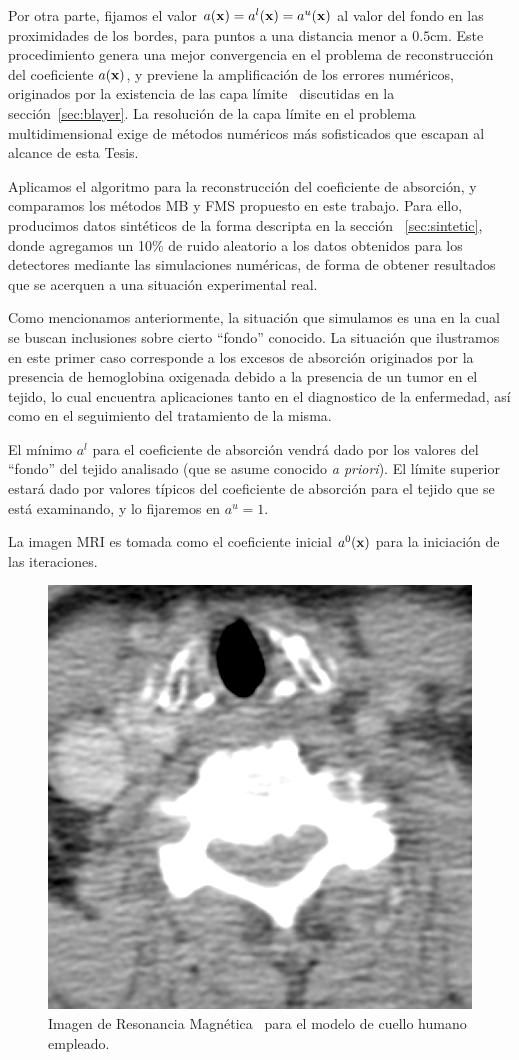 Por otra parte, fijamos el valor  $a(\mathbf{x})=a^l(\mathbf{x})=a^u(\mathbf{x})$ 
al valor del fondo en las proximidades de los bordes, para puntos 
a una distancia menor a $0.5$cm. Este procedimiento genera una mejor 
convergencia en el problema de reconstrucción del coeficiente $a(\mathbf{x})$, y previene 
la amplificación de los errores numéricos, originados por la existencia 
de las capa límite~\cite{Gaggioli2021} discutidas en la sección~\ref{sec:blayer}. 
La resolución de la capa límite en el problema multidimensional exige de métodos 
numéricos más sofisticados que escapan al alcance de esta Tesis. 

Aplicamos el algoritmo para la reconstrucción del coeficiente 
de absorción, y comparamos los métodos MB y FMS propuesto en este trabajo. 
Para ello, producimos datos sintéticos de la forma descripta en la sección~
\ref{sec:sintetic}, donde agregamos un 10\% de ruido aleatorio a los datos obtenidos 
para los detectores mediante las simulaciones numéricas, de forma de obtener 
resultados que se acerquen a una situación experimental real.

Como mencionamos anteriormente, la situación que simulamos es una en la cual se buscan inclusiones sobre 
cierto ``fondo'' conocido. La situación que ilustramos en este primer caso corresponde 
a los excesos de absorción 
originados por la presencia de hemoglobina oxigenada debido a la presencia de un tumor 
en el tejido, lo cual encuentra aplicaciones tanto en el diagnostico de la enfermedad, así 
como en el seguimiento del tratamiento de la misma.

El mínimo $a^l$ para el coeficiente de absorción vendrá dado 
por los valores del ``fondo'' del tejido analisado (que se asume conocido \textit{a priori}). 
El límite superior estará dado por valores típicos del coeficiente de absorción 
para el tejido que se está examinando, y lo fijaremos en $a^u=1$.

La imagen MRI es tomada como el coeficiente inicial $a^0(\mathbf{x})$
para la iniciación de las iteraciones. 

\begin{figure}[h!]
\centering
  \includegraphics[width=0.25\linewidth]{figuras/neck_mri.png} 
  \caption{Imagen de Resonancia Magnética~\cite{CCommons} para el modelo de cuello humano empleado. } 
 \label{fig:mriim}
\end{figure}

